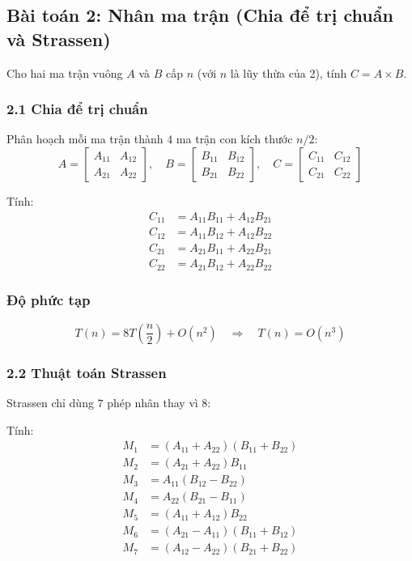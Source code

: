 \documentclass{article}
\begin{document}
\subsection{Bài toán 2: Nhân ma trận (Chia để trị chuẩn và Strassen)}

Cho hai ma trận vuông \(A\) và \(B\) cấp \(n\) (với \(n\) là lũy thừa của 2), tính \(C = A \times B\).

\subsubsection{2.1 Chia để trị chuẩn}

Phân hoạch mỗi ma trận thành \(4\) ma trận con kích thước \(n/2\):
\[
A = \begin{bmatrix} A_{11} & A_{12} \\ A_{21} & A_{22} \end{bmatrix},\quad
B = \begin{bmatrix} B_{11} & B_{12} \\ B_{21} & B_{22} \end{bmatrix},\quad
C = \begin{bmatrix} C_{11} & C_{12} \\ C_{21} & C_{22} \end{bmatrix}
\]

Tính:
\[
\begin{aligned}
C_{11} &= A_{11}B_{11} + A_{12}B_{21} \\
C_{12} &= A_{11}B_{12} + A_{12}B_{22} \\
C_{21} &= A_{21}B_{11} + A_{22}B_{21} \\
C_{22} &= A_{21}B_{12} + A_{22}B_{22}
\end{aligned}
\]

\subsubsection{Độ phức tạp}
\[
T(n) = 8T\left(\frac{n}{2}\right) + O(n^2) \quad\Rightarrow\quad T(n) = O(n^3)
\]

\subsubsection{2.2 Thuật toán Strassen}

Strassen chỉ dùng \(7\) phép nhân thay vì \(8\):

Tính:
\[
\begin{aligned}
M_1 &= (A_{11}+A_{22})(B_{11}+B_{22}) \\
M_2 &= (A_{21}+A_{22})B_{11} \\
M_3 &= A_{11}(B_{12}-B_{22}) \\
M_4 &= A_{22}(B_{21}-B_{11}) \\
M_5 &= (A_{11}+A_{12})B_{22} \\
M_6 &= (A_{21}-A_{11})(B_{11}+B_{12}) \\
M_7 &= (A_{12}-A_{22})(B_{21}+B_{22})
\end{aligned}
\]
\end{document}
